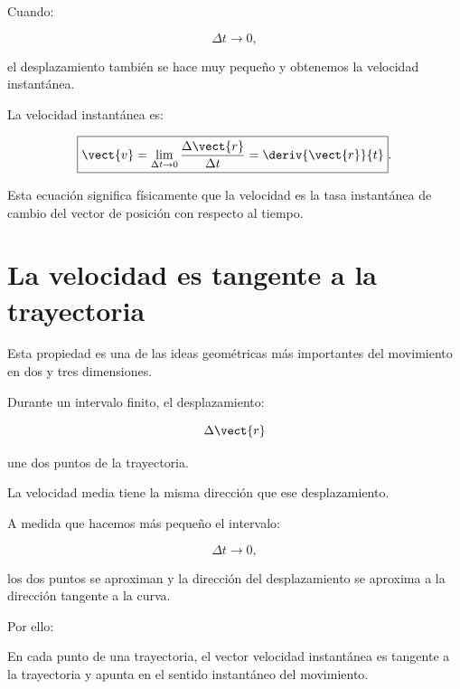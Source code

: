 Cuando:

\[
\Delta t\to0,
\]

el desplazamiento también se hace muy pequeño y obtenemos la velocidad
instantánea.

\begin{definicion}
La velocidad instantánea es:

\[
\boxed{
\vect{v}
=
\lim_{\Delta t\to0}
\frac{\Delta\vect{r}}{\Delta t}
=
\deriv{\vect{r}}{t}
}.
\]
\end{definicion}

Esta ecuación significa físicamente que la velocidad es la tasa instantánea de
cambio del vector de posición con respecto al tiempo.


\section{La velocidad es tangente a la trayectoria}

Esta propiedad es una de las ideas geométricas más importantes del movimiento en
dos y tres dimensiones.

Durante un intervalo finito, el desplazamiento:

\[
\Delta\vect{r}
\]

une dos puntos de la trayectoria.

La velocidad media tiene la misma dirección que ese desplazamiento.

A medida que hacemos más pequeño el intervalo:

\[
\Delta t\to0,
\]

los dos puntos se aproximan y la dirección del desplazamiento se aproxima a la
dirección tangente a la curva.

Por ello:

\begin{principio}
En cada punto de una trayectoria, el vector velocidad instantánea es tangente a
la trayectoria y apunta en el sentido instantáneo del movimiento.
\end{principio}

